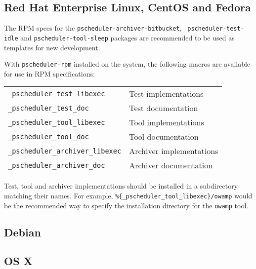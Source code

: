 \documentclass[10pt,titlepage]{article}
\begin{document}
\subsection{Red Hat Enterprise Linux, CentOS and Fedora}

The RPM specs for the {\tt pscheduler-archiver-bitbucket}, {\tt
  pscheduler-test-idle} and {\tt pscheduler-tool-sleep} packages are
recommended to be used as templates for new development.

With {\tt pscheduler-rpm} installed on the system, the following
macros are available for use in RPM specifications:
\begin{center}
  \begin{tabular}{ll} 
    {\tt \_pscheduler\_test\_libexec} & Test implementations \\
    {\tt \_pscheduler\_test\_doc} & Test documentation \\
    {\tt \_pscheduler\_tool\_libexec} & Tool implementations \\
    {\tt \_pscheduler\_tool\_doc} & Tool documentation \\
    {\tt \_pscheduler\_archiver\_libexec} & Archiver implementations \\
    {\tt \_pscheduler\_archiver\_doc} & Archiver documentation \\
  \end{tabular}
\end{center}

Test, tool and archiver implementations should be installed in a
subdirectory matching their names.  For example,
{\tt\%\{\_pscheduler\_tool\_libexec\}/owamp} would be the recommended
way to specify the installation directory for the {\tt owamp} tool.

\subsection{Debian}

\subsection{OS X}
\end{document}
